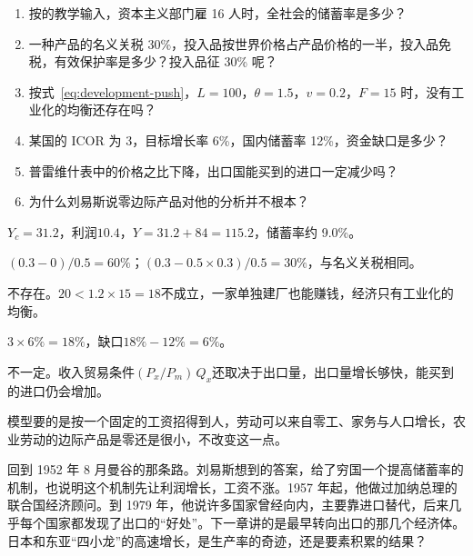 \begin{selfcheck}
\begin{enumerate}
\item 按的教学输入，资本主义部门雇 16 人时，全社会的储蓄率是多少？
\item 一种产品的名义关税 30\%，投入品按世界价格占产品价格的一半，投入品免税，有效保护率是多少？投入品征 30\% 呢？
\item 按式~\eqref{eq:development-push}，$L=100$，$\theta=1.5$，$v=0.2$，$F=15$ 时，没有工业化的均衡还存在吗？
\item 某国的 ICOR 为 3，目标增长率 6\%，国内储蓄率 12\%，资金缺口是多少？
\item 普雷维什表中的价格之比下降，出口国能买到的进口一定减少吗？
\item 为什么刘易斯说零边际产品对他的分析并不根本？
\end{enumerate}
\end{selfcheck}

\begin{answers}
\item $Y_c=31.2$，利润$10.4$，$Y=31.2+84=115.2$，储蓄率约 9.0\%。
\item $(0.3-0)/0.5=60\%$；$(0.3-0.5\times0.3)/0.5=30\%$，与名义关税相同。
\item 不存在。$20<1.2\times15=18$不成立，一家单独建厂也能赚钱，经济只有工业化的均衡。
\item $3\times6\%=18\%$，缺口$18\%-12\%=6\%$。
\item 不一定。收入贸易条件$(P_x/P_m)\,Q_x$还取决于出口量，出口量增长够快，能买到的进口仍会增加。
\item 模型要的是按一个固定的工资招得到人，劳动可以来自零工、家务与人口增长，农业劳动的边际产品是零还是很小，不改变这一点。
\end{answers}

回到 1952 年 8 月曼谷的那条路。刘易斯想到的答案，给了穷国一个提高储蓄率的机制，也说明这个机制先让利润增长，工资不涨。1957 年起，他做过加纳总理的联合国经济顾问。到 1979 年，他说许多国家曾经向内，主要靠进口替代，后来几乎每个国家都发现了出口的“好处”\cite{lewis1979}。下一章讲的是最早转向出口的那几个经济体。日本和东亚“四小龙”的高速增长，是生产率的奇迹，还是要素积累的结果？
